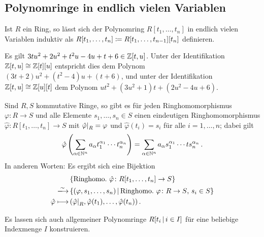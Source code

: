 \subsection{Polynomringe in endlich vielen Variablen}

Ist $R$ ein Ring, so lässt sich der Polynomring $R[t_1, \dotsc, t_n]$ in endlich vielen Variablen induktiv als $R[t_1, \dotsc, t_n] \coloneqq R[t_1, \dotsc, t_{n-1}][t_n]$ definieren.

\begin{example}
  Es gilt $3tu^2 + 2u^2 + t^2 u - 4u + t + 6 \in \mathbb{Z}[t, u]$.
  Unter der Identifikation $\mathbb{Z}[t,u] \cong \mathbb{Z}[t][u]$ entspricht dies dem Polynom $(3t+2) u^2 + (t^2 - 4)u + (t + 6)$, und unter der Identifikation $\mathbb{Z}[t,u] \cong \mathbb{Z}[u][t]$ dem Polynom $ut^2 + (3u^2 + 1)t + (2u^2 - 4u + 6)$.
\end{example}


\begin{theorem}
  Sind $R, S$ kommutative Ringe, so gibt es für jeden Ringhomomorphismus $\varphi \colon R \to S$ und alle Elemente $s_1, \dotsc, s_n \in S$ einen eindeutigen Ringhomomorphismus $\hat{\varphi} \colon R[t_1, \dotsc, t_n] \to S$ mit $\restrict{\hat{\varphi}}{R} = \varphi$ und $\hat{\varphi}(t_i) = s_i$ für alle $i = 1, \dotsc, n$;
  dabei gilt
  \[
      \hat{\varphi}\left( \sum_{\alpha \in \mathbb{N}^n} a_\alpha t_1^{\alpha_1} \dotsm t_n^{\alpha_n} \right)
    = \sum_{\alpha \in \mathbb{N}^n} a_\alpha s_1^{\alpha_1} \dotsm ts_n^{\alpha_n} \,.
  \]
  In anderen Worten:
  Es ergibt sich eine Bijektion
  \begin{align*}
                          &\, \{\text{Ringhomo.\ $\hat{\varphi} \colon R[t_1, \dotsc, t_n] \to S$}\}  \\
    \xlongrightarrow{\sim}&\, \{
                                (\varphi, s_1, \dotsc, s_n)
                              \suchthat
                                  \text{Ringhomo.\ $\varphi \colon R \to S$, $s_i \in S$}
                              \}  \\
                              \hat{\varphi}
    \longmapsto&\,            ( \restrict{\hat{\varphi}}{R}, \hat{\varphi}(t_1), \dotsc, \hat{\varphi}(t_n) ) \,.
  \end{align*}
\end{theorem}

\begin{remark}
  Es lassen sich auch allgemeiner Polynomringe $R[t_i \suchthat i \in I]$ für eine beliebige Indexmenge $I$ konstruieren.
\end{remark}

